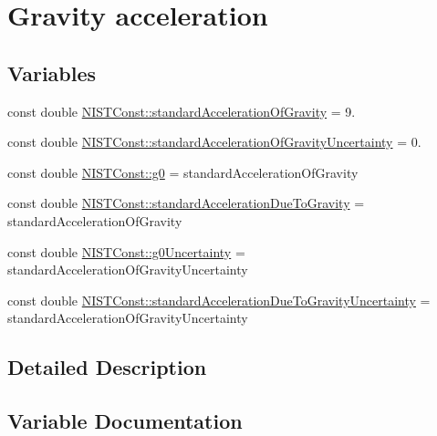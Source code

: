 \hypertarget{group___n_i_s_t_const-_gravity_acceleration}{}\section{Gravity acceleration}
\label{group___n_i_s_t_const-_gravity_acceleration}
\subsection*{Variables}
\begin{DoxyCompactItemize}
\item 
const double \hyperlink{group___n_i_s_t_const-_gravity_acceleration_gad5bc5f7f030bc2c467a8430e00b42f5e}{N\+I\+S\+T\+Const\+::standard\+Acceleration\+Of\+Gravity} = 9.
\item 
const double \hyperlink{group___n_i_s_t_const-_gravity_acceleration_gaabc6df92c25677a5b767445f101d4f57}{N\+I\+S\+T\+Const\+::standard\+Acceleration\+Of\+Gravity\+Uncertainty} = 0.
\item 
const double \hyperlink{group___n_i_s_t_const-_gravity_acceleration_ga1fd0cec0a449e40eb603ac6292027924}{N\+I\+S\+T\+Const\+::g0} = standard\+Acceleration\+Of\+Gravity
\item 
const double \hyperlink{group___n_i_s_t_const-_gravity_acceleration_ga7d417cb0027680e48ff481ab68a0864e}{N\+I\+S\+T\+Const\+::standard\+Acceleration\+Due\+To\+Gravity} = standard\+Acceleration\+Of\+Gravity
\item 
const double \hyperlink{group___n_i_s_t_const-_gravity_acceleration_ga2d6c266044ae894212cef601eb974a0f}{N\+I\+S\+T\+Const\+::g0\+Uncertainty} = standard\+Acceleration\+Of\+Gravity\+Uncertainty
\item 
const double \hyperlink{group___n_i_s_t_const-_gravity_acceleration_ga80a7a9469b199febff956dcbda1b5e1b}{N\+I\+S\+T\+Const\+::standard\+Acceleration\+Due\+To\+Gravity\+Uncertainty} = standard\+Acceleration\+Of\+Gravity\+Uncertainty
\end{DoxyCompactItemize}


\subsection{Detailed Description}


\subsection{Variable Documentation}
\mbox{\label{group___n_i_s_t_const-_gravity_acceleration_ga1fd0cec0a449e40eb603ac6292027924}} 
